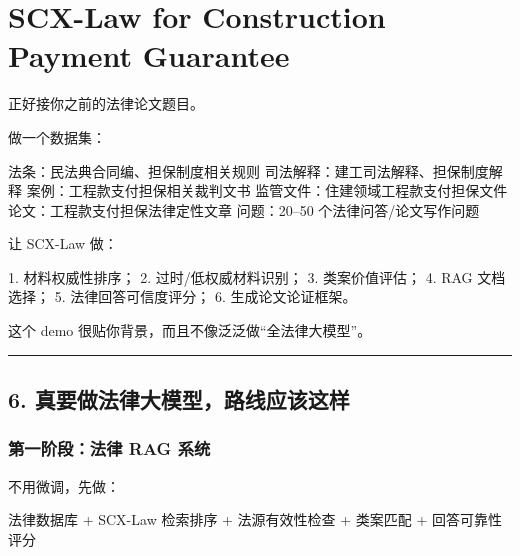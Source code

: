 \documentclass[
  12pt,
]{ctexart}
\newenvironment{Shaded}{}{}
\newcommand{\NormalTok}[1]{#1}
\begin{document}
\section{\texorpdfstring{\textbf{SCX-Law for Construction Payment
Guarantee}}{SCX-Law for Construction Payment Guarantee}}\label{scx-law-for-construction-payment-guarantee}

正好接你之前的法律论文题目。

做一个数据集：

\begin{Shaded}
\begin{Highlighting}[]
\NormalTok{法条：民法典合同编、担保制度相关规则}
\NormalTok{司法解释：建工司法解释、担保制度解释}
\NormalTok{案例：工程款支付担保相关裁判文书}
\NormalTok{监管文件：住建领域工程款支付担保文件}
\NormalTok{论文：工程款支付担保法律定性文章}
\NormalTok{问题：20–50 个法律问答/论文写作问题}
\end{Highlighting}
\end{Shaded}

让 SCX-Law 做：

\begin{Shaded}
\begin{Highlighting}[]
\NormalTok{1. 材料权威性排序；}
\NormalTok{2. 过时/低权威材料识别；}
\NormalTok{3. 类案价值评估；}
\NormalTok{4. RAG 文档选择；}
\NormalTok{5. 法律回答可信度评分；}
\NormalTok{6. 生成论文论证框架。}
\end{Highlighting}
\end{Shaded}

这个 demo 很贴你背景，而且不像泛泛做``全法律大模型''。

\begin{center}\rule{0.5\linewidth}{0.5pt}\end{center}

\subsection{6.
真要做法律大模型，路线应该这样}\label{ux771fux8981ux505aux6cd5ux5f8bux5927ux6a21ux578bux8defux7ebfux5e94ux8be5ux8fd9ux6837}

\subsubsection{第一阶段：法律 RAG
系统}\label{ux7b2cux4e00ux9636ux6bb5ux6cd5ux5f8b-rag-ux7cfbux7edf}

不用微调，先做：

\begin{Shaded}
\begin{Highlighting}[]
\NormalTok{法律数据库}
\NormalTok{+ SCX{-}Law 检索排序}
\NormalTok{+ 法源有效性检查}
\NormalTok{+ 类案匹配}
\NormalTok{+ 回答可靠性评分}
\end{Highlighting}
\end{Shaded}
\end{document}
